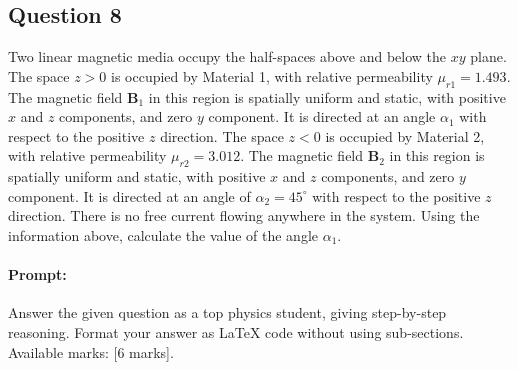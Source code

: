 \documentclass{article}
\begin{document}
\subsection{Question 8}
 Two linear magnetic media occupy the half-spaces above and below the $xy$ plane. The space $z > 0$ is occupied by Material 1, with relative permeability $\mu_{r1} = 1.493$. The magnetic field $\mathbf{B}_1$ in this region is spatially uniform and static, with positive $x$ and $z$ components, and zero $y$ component. It is directed at an angle $\alpha_1$ with respect to the positive $z$ direction. The space $z < 0$ is occupied by Material 2, with relative permeability $\mu_{r2} = 3.012$. The magnetic field $\mathbf{B}_2$ in this region is spatially uniform and static, with positive $x$ and $z$ components, and zero $y$ component. It is directed at an angle of $\alpha_2 = 45^\circ$ with respect to the positive $z$ direction. There is no free current flowing anywhere in the system. Using the information above, calculate the value of the angle $\alpha_1$.


\paragraph{Prompt: \\} 
Answer the given question as a top physics student, giving step-by-step reasoning. Format your answer as LaTeX code without using sub-sections. Available marks: [6 marks].
\end{document}
